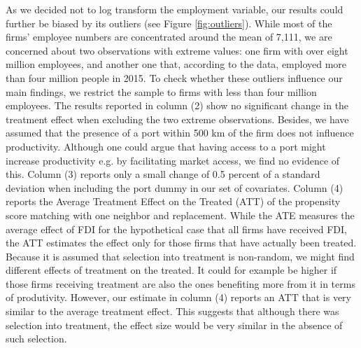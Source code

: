 \documentclass[a4paper,11pt]{scrartcl}
\begin{document}
As we decided not to log transform the employment variable, our results could further be biased by its outliers (see Figure \ref{fig:outliers}). While most of the firms' employee numbers are concentrated around the mean of 7,111, we are concerned about two observations with extreme values: one firm with over eight million employees, and another one that, according to the data, employed more than four million people in 2015. To check whether these outliers influence our main findings, we restrict the sample to firms with less than four million employees. The results reported in column (2) show no significant change in the treatment effect when excluding the two extreme observations. Besides, we have assumed that the presence of a port within 500 km of the firm does not influence productivity. Although one could argue that having access to a port might increase productivity e.g. by facilitating market access, we find no evidence of this.  Column (3) reports only a small change of 0.5 percent of a standard deviation when including the port dummy in our set of covariates. 
Column (4) reports the Average Treatment Effect on the Treated (ATT) of the propensity score matching with one neighbor and replacement. While the ATE measures the average effect of FDI for the hypothetical case that all firms have received FDI, the ATT estimates the effect only for those firms that have actually been treated. Because it is assumed that selection into treatment is non-random, we might find different effects of treatment on the treated. It could for example be higher if those firms receiving treatment are also the ones benefiting more from it in terms of produtivity.
 However, our estimate in column (4) reports an ATT that is very similar to the average treatment effect. This suggests that although there was selection into treatment, the effect size would be very similar in the absence of such selection. 
\end{document}
